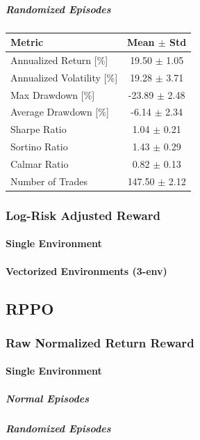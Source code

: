 \documentclass[12pt,a4paper]{report}
\begin{document}
\subparagraph{Randomized Episodes}

\begin{center}
\begin{tabular}{l c}
\toprule
\textbf{Metric} & \textbf{Mean $\pm$ Std} \\
\midrule
Annualized Return [\%]      & 19.50 $\pm$ 1.05 \\
Annualized Volatility [\%]  & 19.28 $\pm$ 3.71 \\
Max Drawdown [\%]           & -23.89 $\pm$ 2.48 \\
Average Drawdown [\%]       & -6.14 $\pm$ 2.34 \\
Sharpe Ratio                & 1.04 $\pm$ 0.21 \\
Sortino Ratio               & 1.43 $\pm$ 0.29 \\
Calmar Ratio                & 0.82 $\pm$ 0.13 \\
Number of Trades            & 147.50 $\pm$ 2.12 \\
\bottomrule
\end{tabular}
\label{tab:ppo-raw-3env-random}
\end{center}

\subsubsection{Log-Risk Adjusted Reward}
\paragraph{Single Environment}
\paragraph{Vectorized Environments (3-env)}

\subsection{RPPO}
\subsubsection{Raw Normalized Return Reward}
\paragraph{Single Environment}
\subparagraph{Normal Episodes}
\subparagraph{Randomized Episodes}
\end{document}
